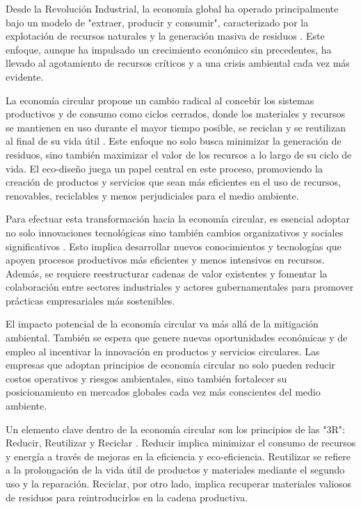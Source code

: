 \documentclass[main.tex]{subfiles}
\begin{document}
Desde la Revolución Industrial, la economía global ha operado principalmente bajo un modelo de "extraer, producir y consumir", caracterizado por la explotación de recursos naturales y la generación masiva de residuos \cite{cerda2016economia}. Este enfoque, aunque ha impulsado un crecimiento económico sin precedentes, ha llevado al agotamiento de recursos críticos y a una crisis ambiental cada vez más evidente.

La economía circular propone un cambio radical al concebir los sistemas productivos y de consumo como ciclos cerrados, donde los materiales y recursos se mantienen en uso durante el mayor tiempo posible, se reciclan y se reutilizan al final de su vida útil \cite{circular2017economia}. Este enfoque no solo busca minimizar la generación de residuos, sino también maximizar el valor de los recursos a lo largo de su ciclo de vida. El eco-diseño juega un papel central en este proceso, promoviendo la creación de productos y servicios que sean más eficientes en el uso de recursos, renovables, reciclables y menos perjudiciales para el medio ambiente.

Para efectuar esta transformación hacia la economía circular, es esencial adoptar no solo innovaciones tecnológicas sino también cambios organizativos y sociales significativos \cite{espanacircular2030}. Esto implica desarrollar nuevos conocimientos y tecnologías que apoyen procesos productivos más eficientes y menos intensivos en recursos. Además, se requiere reestructurar cadenas de valor existentes y fomentar la colaboración entre sectores industriales y actores gubernamentales para promover prácticas empresariales más sostenibles.

El impacto potencial de la economía circular va más allá de la mitigación ambiental. También se espera que genere nuevas oportunidades económicas y de empleo al incentivar la innovación en productos y servicios circulares. Las empresas que adoptan principios de economía circular no solo pueden reducir costos operativos y riesgos ambientales, sino también fortalecer su posicionamiento en mercados globales cada vez más conscientes del medio ambiente.

Un elemento clave dentro de la economía circular son los principios de las "3R": Reducir, Reutilizar y Reciclar \cite{cerda2016economia}. Reducir implica minimizar el consumo de recursos y energía a través de mejoras en la eficiencia y eco-eficiencia. Reutilizar se refiere a la prolongación de la vida útil de productos y materiales mediante el segundo uso y la reparación. Reciclar, por otro lado, implica recuperar materiales valiosos de residuos para reintroducirlos en la cadena productiva.
\end{document}
